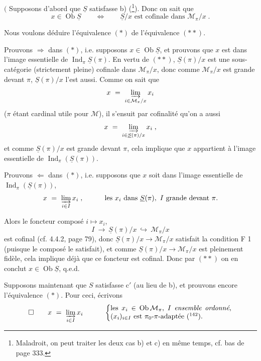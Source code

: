 \documentclass[11pt]{article}
\newcommand{\printedpage}[1]{\marginpar{\footnotesize p.~#1}}
\newcommand{\msp}[1]{\marginpar{\footnotesize [#1]}}
\newcommand{\Ob}{\operatorname{Ob}}
\DeclareMathOperator{\Ind}{Ind}
\begin{document}
\msp{page 332}

$\Bigg($ Supposons d'abord que $\underline{S}$ satisfasse b) (\footnote[141]{Maladroit, on peut traiter les deux cas b) et c) en même temps, cf. bas de page 333.}). Donc on sait que
\[
x \in \Ob\underline{S} \qquad \Longleftrightarrow \qquad \underline{S}/x \text{ est cofinale dans } \mathcal{M}_\pi/x \; . \tag*{$(**)$}
\]

Nous voulons déduire l'équivalence $(*)$ de l'équivalence $(**)$.

Prouvons $\Longrightarrow$ dans $(*)$, i.e. supposons $x \in \Ob\underline{S}$, et prouvons que $x$ est dans l'image essentielle de $\Ind_\pi\underline{S}(\pi)$. En vertu de $(**)$, $\underline{S}(\pi)/x$ est une sous-catégorie (strictement pleine) cofinale dans $\mathcal{M}_\pi/x$, donc comme $\mathcal{M}_\pi/x$ est grande devant $\pi$, $\underline{S}(\pi)/x$ l'est aussi. Comme on sait que
\[
x \ = \ \varinjlim_{i\in\mathcal{M}_\pi/x} x_i
\]
($\pi$ étant cardinal utile pour $\mathcal{M}$), il s'ensuit par cofinalité qu'on a aussi
\[
x \ = \ \varinjlim_{i\in\underline{S}(\pi)/x} x_i \; ,
\]
et comme $\underline{S}(\pi)/x$ est grande devant $\pi$, cela implique que $x$ appartient à l'image essentielle de $\Ind_\pi(\underline{S}(\pi))$.

Prouvons $\Longleftarrow$ dans $(*)$, i.e. supposons que $x$ soit dans l'image essentielle de $\Ind_\pi(\underline{S}(\pi))$,
\printedpage{126}
\msp{page 333}
\[
x \ = \ \varinjlim_{i\in I} x_i \; , \qquad\quad \text{les } x_i \text{ dans } \underline{S}(\pi),\ I \text{ grande devant } \pi.
\]

Alors le foncteur composé $i \longmapsto x_i$,
\[
I \ \longrightarrow \ \underline{S}(\pi)/x \ \hookrightarrow \ \mathcal{M}_\pi/x
\]
est cofinal (cf. 4.4.2, page 79), donc $\underline{S}(\pi)/x \longrightarrow \mathcal{M}_\pi/x$ satisfait la condition F 1 (puisque le composé le satisfait), et comme $\underline{S}(\pi)/x \longrightarrow \mathcal{M}_\pi/x$ est pleinement fidèle, cela implique déjà que ce foncteur est cofinal. Donc par $(**)$ on en conclut $x \in \Ob\underline{S}$, q.e.d.

Supposons maintenant que $S$ satisfasse c$'$ (au lieu de b), et prouvons encore l'équivalence $(*)$. Pour ceci, écrivons
\[
\square \qquad x \ = \ \varinjlim_{i\in I} x_i \qquad\quad
\left\{
\begin{minipage}[c]{0.5\textwidth}
les $x_i \in \Ob\mathcal{M}_\pi$, $I$ \textit{ensemble ordonné}, $(x_i)_{i\in I}$ est $\pi_0$-$\pi$-adaptée (\footnotemark[142]).
\end{minipage}
\right.
\]
\end{document}
